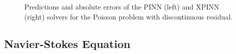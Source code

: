 \begin{figure}
\hfill
{}
\caption{Predictions and absolute errors of the PINN (left) and XPINN (right) solvers for the Poisson problem with discontinuous residual.}
\label{fig:poisson_discontinuous}
\end{figure}


\subsection{Navier-Stokes Equation}
